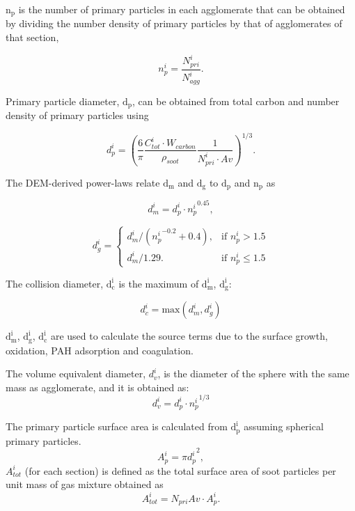 $\mathrm{n_p}$ is the number of primary particles in each agglomerate that can be obtained by dividing the number density of primary particles by that of agglomerates of that section,

\begin{equation}
	n^i_p = \frac{N^i_{pri}}{N^i_{agg}}
	\label{eqn:n_p}.
\end{equation}

Primary particle diameter, $\mathrm{d_p}$, can be obtained from total carbon and number density of primary particles using

\begin{equation}
	d^i_p = \left(\frac{6}{\pi} \frac{C^i_{tot}\cdot W_{carbon}}{\rho_{soot}} \frac{1}{N^i_{pri}\cdot Av} \right)^{1/3}
	\label{eqn:d_p}.
\end{equation}

The DEM-derived power-laws relate $\mathrm{d_m}$ and $\mathrm{d_g}$ to $\mathrm{d_p}$ and $\mathrm{n_p}$ as

\begin{equation}
	d^i_{m} = d^i_p\cdot {n^i_p}^{0.45}
	\label{eqn:d_m},
\end{equation}

\begin{equation}
	d^i_g = 
	\left\{
	\begin{array}{lr}
		d^i_m/({n^i_p}^{-0.2}+0.4), & \text{if } n^i_p > 1.5\\
		d^i_m/1.29. & \text{if } n^i_p\leq 1.5
	\end{array}
	\right.
	\label{eqn:d_g}
\end{equation}

The collision diameter, $\mathrm{d^i_c}$ is the maximum of $\mathrm{d^i_{m}}$, $\mathrm{d^i_{g}}$:

\begin{equation}
	d^i_c = \mathrm{max}\left(d^i_m, d^i_g\right)
	\label{eqn:d_c}
\end{equation}

$\mathrm{d^i_{m}}$, $\mathrm{d^i_{g}}$, $\mathrm{d^i_{c}}$ are used to calculate the source terms due to the surface growth, oxidation, PAH adsorption and coagulation. 

The volume equivalent diameter, $d^i_v$, is the diameter of the sphere with the same mass as agglomerate, and it is obtained as:
\begin{equation}
	d^i_v = d^i_p \cdot {n^i_p}^{1/3}
	\label{eqn:d_v}
\end{equation}

The primary particle surface area is calculated from $\mathrm{d^i_p}$ assuming spherical primary particles.
\begin{equation}
	A^i_{p} = \pi {d^i_p}^2
	\label{eqn:Ap},
\end{equation}
$A^i_{tot}$ (for each section) is defined as the total surface area of soot particles per unit mass of gas mixture obtained as
\begin{equation}
	A^i_{tot} = N_{pri}Av\cdot A^i_{p}
	\label{eqn:Atot}.
\end{equation}

